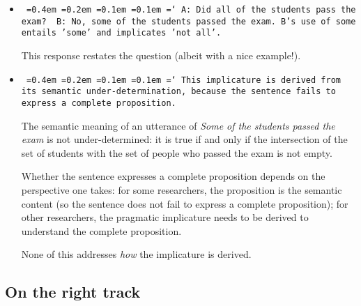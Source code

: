 \documentclass[a4,11pt]{article}
\newcommand*\justify{%
  \fontdimen2\font=0.4em%
  \fontdimen3\font=0.2em%
  \fontdimen4\font=0.1em%
  \fontdimen7\font=0.1em%
  \hyphenchar\font=`\-%
}
\begin{document}
\begin{itemize}[leftmargin = 12pt]

\item \texttt{\justify A: Did all of the students pass the exam? 
\\ B: No, some of the students passed the exam.
\\ B's use of some entails 'some' and implicates 'not all'.}

This response restates the question (albeit with a nice example!).

\item \texttt{\justify This implicature is derived from its semantic under-determination, because the sentence fails to express a complete proposition.}

The semantic meaning of an utterance of {\em Some of the students passed the exam} is not under-determined: it is true if and only if the intersection of the set of students with the set of people who passed the exam is not empty. 

Whether the sentence expresses a complete proposition depends on the perspective one takes: for some researchers, the proposition is the semantic content (so the sentence does not fail to express a complete proposition); for other researchers, the pragmatic implicature needs to be derived to understand the complete proposition. 

None of this addresses {\em how} the implicature is derived.

\end{itemize}


\subsection*{On the right track}
\end{document}
